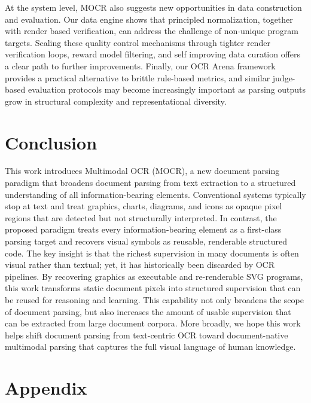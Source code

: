 \documentclass{article}
\begin{document}
At the system level, MOCR also suggests new opportunities in data construction and evaluation. Our data engine shows that principled normalization, together with render based verification, can address the challenge of non-unique program targets. Scaling these quality control mechanisms through tighter render verification loops, reward model filtering, and self improving data curation offers a clear path to further improvements. Finally, our OCR Arena framework provides a practical alternative to brittle rule-based metrics, and similar judge-based evaluation protocols may become increasingly important as parsing outputs grow in structural complexity and representational diversity.

\section{Conclusion}
\label{sec:conclusion}
This work introduces Multimodal OCR (MOCR), a new document parsing paradigm that broadens document parsing from text extraction to a structured understanding of all information-bearing elements. Conventional systems typically stop at text and treat graphics, charts, diagrams, and icons as opaque pixel regions that are detected but not structurally interpreted. In contrast, the proposed paradigm treats every information-bearing element as a first-class parsing target and recovers visual symbols as reusable, renderable structured code. The key insight is that the richest supervision in many documents is often visual rather than textual; yet, it has historically been discarded by OCR pipelines. By recovering graphics as executable and re-renderable SVG programs, this work transforms static document pixels into structured supervision that can be reused for reasoning and learning. This capability not only broadens the scope of document parsing, but also increases the amount of usable supervision that can be extracted from large document corpora. More broadly, we hope this work helps shift document parsing from text-centric OCR toward document-native multimodal parsing that captures the full visual language of human knowledge.

{
    \small
    
    
}

\newpage 


\clearpage

\setcounter{page}{1}


\appendix
\section{Appendix}
\end{document}
